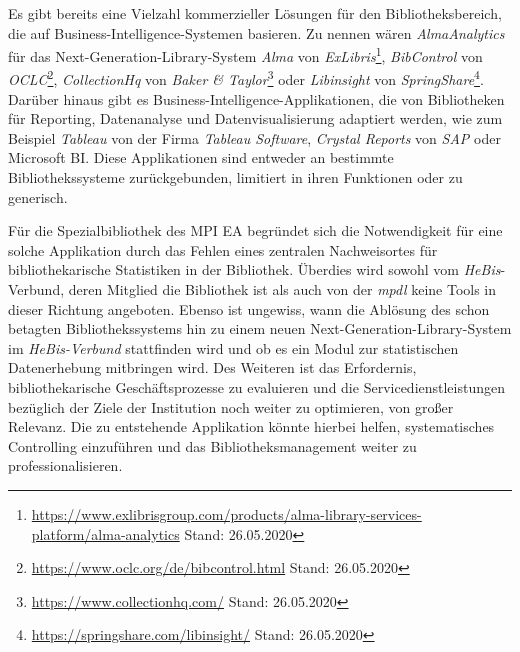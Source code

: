 Es gibt bereits eine Vielzahl kommerzieller Lösungen für den Bibliotheksbereich, die auf Business-Intelligence-Systemen basieren.
Zu nennen wären \textit{AlmaAnalytics} für das Next-Generation-Library-System \textit{Alma} von \textit{ExLibris}\footnote{\url{https://www.exlibrisgroup.com/products/alma-library-services-platform/alma-analytics}
Stand: 26.05.2020}, \textit{BibControl} von \textit{OCLC}\footnote{\url{https://www.oclc.org/de/bibcontrol.html} Stand: 26.05.2020},
\textit{CollectionHq} von \textit{Baker \& Taylor}\footnote{\url{https://www.collectionhq.com/} Stand: 26.05.2020} oder \textit{Libinsight} von \textit{SpringShare}\footnote{\url{https://springshare.com/libinsight/} Stand: 26.05.2020}.
Darüber hinaus gibt es Business-Intelligence-Applikationen, die von Bibliotheken für Reporting, Datenanalyse und Datenvisualisierung adaptiert werden,
wie zum Beispiel \textit{Tableau} von der Firma \textit{Tableau Software},
\textit{Crystal Reports} von \textit{SAP} oder Microsoft BI.
Diese Applikationen sind entweder an bestimmte Bibliothekssysteme zurückgebunden, limitiert in ihren
Funktionen\cite{golas_statistische_2018} oder zu generisch.

Für die Spezialbibliothek des \acrfull{MPI EA} begründet sich die Notwendigkeit für eine solche Applikation durch das
Fehlen eines zentralen Nachweisortes für bibliothekarische
Statistiken in der Bibliothek. Überdies wird sowohl vom \textit{HeBis}-Verbund, deren Mitglied die Bibliothek ist als auch 
von der \textit{mpdl} keine Tools in dieser Richtung angeboten. Ebenso ist ungewiss, wann die Ablösung des schon betagten Bibliothekssystems hin zu 
einem neuen Next-Generation-Library-System im \textit{HeBis-Verbund} stattfinden wird und ob
es ein Modul zur statistischen Datenerhebung mitbringen wird. 
Des Weiteren ist das Erfordernis, bibliothekarische Geschäftsprozesse zu evaluieren und die
Servicedienstleistungen bezüglich der Ziele der Institution noch weiter zu
optimieren, von großer Relevanz. 
Die zu entstehende Applikation könnte hierbei helfen, systematisches Controlling einzuführen und das
Bibliotheksmanagement weiter zu professionalisieren.


